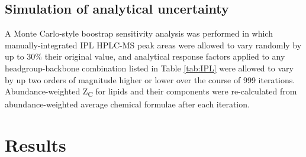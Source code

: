 \subsection{Simulation of analytical uncertainty} A Monte Carlo-style boostrap sensitivity analysis was performed in which manually-integrated IPL HPLC-MS peak areas were allowed to vary randomly by up to 30\% their original value, and analytical response factors applied to any headgroup-backbone combination listed in Table \ref{tab:IPL} were allowed to vary by up two orders of magnitude higher or lower over the course of 999 iterations. Abundance-weighted Z\textsubscript{C} for lipids and their components were re-calculated from abundance-weighted average chemical formulae after each iteration.


\section{Results}

